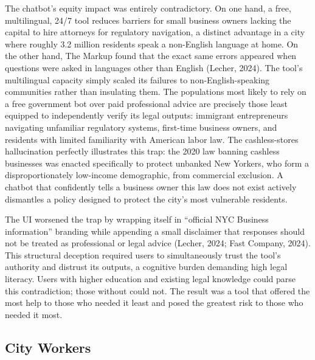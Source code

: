 \documentclass[10pt, twocolumn]{article}
\begin{document}
The chatbot's equity impact was entirely contradictory. On one hand, a free, multilingual, 24/7 tool reduces barriers for small business owners lacking the capital to hire attorneys for regulatory navigation, a distinct advantage in a city where roughly 3.2 million residents speak a non-English language at home. On the other hand, The Markup found that the exact same errors appeared when questions were asked in languages other than English (Lecher, 2024). The tool's multilingual capacity simply scaled its failures to non-English-speaking communities rather than insulating them. The populations most likely to rely on a free government bot over paid professional advice are precisely those least equipped to independently verify its legal outputs: immigrant entrepreneurs navigating unfamiliar regulatory systems, first-time business owners, and residents with limited familiarity with American labor law. The cashless-stores hallucination perfectly illustrates this trap: the 2020 law banning cashless businesses was enacted specifically to protect unbanked New Yorkers, who form a disproportionately low-income demographic, from commercial exclusion. A chatbot that confidently tells a business owner this law does not exist actively dismantles a policy designed to protect the city's most vulnerable residents.

The UI worsened the trap by wrapping itself in ``official NYC Business information'' branding while appending a small disclaimer that responses should not be treated as professional or legal advice (Lecher, 2024; Fast Company, 2024). This structural deception required users to simultaneously trust the tool's authority and distrust its outputs, a cognitive burden demanding high legal literacy. Users with higher education and existing legal knowledge could parse this contradiction; those without could not. The result was a tool that offered the most help to those who needed it least and posed the greatest risk to those who needed it most.

\subsection*{City Workers}
\end{document}
